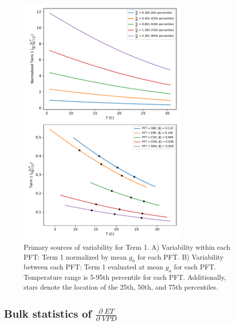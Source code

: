 \documentclass[draft,linenumbers]{agujournal}
\begin{document}
\begin{figure}[h]
\centering
\includegraphics[width=20pc]{./fig04.pdf}
\caption{Primary sources of variability for Term 1. A) Variability within each PFT: Term 1 normalized by mean $g_a$ for each PFT. B) Variability between each PFT: Term 1 evaluated at mean $g_a$ for each PFT. Temperature range is 5-95th percentile for each PFT. Additionally, stars denote the location of the 25th, 50th, and 75th percentiles.}
\label{scale_vary}
\end{figure}

\subsection{Bulk statistics of $\frac{\partial \; ET}{\partial \; VPD}$}
\end{document}
